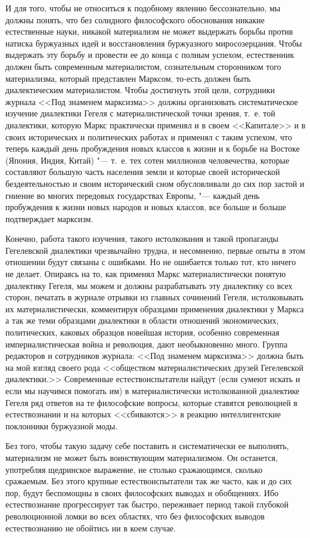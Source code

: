 И для того, чтобы не относиться к подобному явлению бессознательно, мы
должны понять, что без солидного философского обоснования никакие
естественные науки, никакой материализм не может выдержать борьбы против
натиска буржуазных идей и восстановления буржуазного миросозерцания. Чтобы
выдержать эту борьбу и провести ее до конца с полным успехом, естественник
должен быть современным материалистом, сознательным сторонником того
материализма, который представлен Марксом, то-есть должен быть
диалектическим материалистом. Чтобы достигнуть этой цели, сотрудники
журнала <<Под знаменем марксизма>> должны организовать систематическое
изучение диалектики Гегеля с материалистической точки зрения, т.~е. той
диалектики, которую Маркс практически применял и в своем <<Капитале>> и в
своих исторических и политических работах и применял с таким успехом, что
теперь каждый день пробуждения новых классов к жизни и к борьбе на Востоке
(Япония, Индия, Китай) "--- т.~е. тех сотен миллионов человечества, которые
составляют большую часть населения земли и которые своей исторической
бездеятельностью и своим исторический сном обусловливали до сих пор застой
и гниение во многих передовых государствах Европы, "--- каждый день
пробуждения к жизни новых народов и новых классов, все больше и больше
подтверждает марксизм.

Конечно, работа такого изучения, такого истолкования и такой пропаганды
Гегелевской диалектики чрезвычайно трудна, и несомненно, первые опыты в
этом отношении будут связаны с ошибками. Но не ошибается только тот, кто
ничего не делает. Опираясь на то, как применял Маркс материалистически
понятую диалектику Гегеля, мы можем и должны разрабатывать эту диалектику
со всех сторон, печатать в журнале отрывки из главных сочинений Гегеля,
истолковывать их материалистически, комментируя образцами применения
диалектики у Маркса а так же теми образцами диалектики в области отношений
экономических, политических, каковых образцов новейшая история, особенно
современная империалистическая война и революция, дают необыкновенно много.
Группа редакторов и сотрудников журнала: <<Под знаменем марксизма>> должна
быть на мой взгляд своего рода <<обществом материалистических друзей
Гегелевской диалектики.>> Современные естествоиспытатели найдут (если сумеют
искать и если мы научимся помогать им) в материалистически истолкованной
диалектике Гегеля ряд ответов на те философские вопросы, которые ставятся
революцией в естествознании и на которых <<сбиваются>> в реакцию
интеллигентские поклонники буржуазной моды.

Без того, чтобы такую задачу себе поставить и систематически ее выполнять,
материализм не может быть воинствующим материализмом. Он останется,
употребляя щедринское выражение, не столько сражающимся, сколько сражаемым.
Без этого крупные естествоиспытатели так же часто, как и до сих пор, будут
беспомощны в своих философских выводах и обобщениях. Ибо естествознание
прогрессирует так быстро, переживает период такой глубокой революционной
ломки во всех областях, что без философских выводов естествознанию не
обойтись ни в коем случае.

